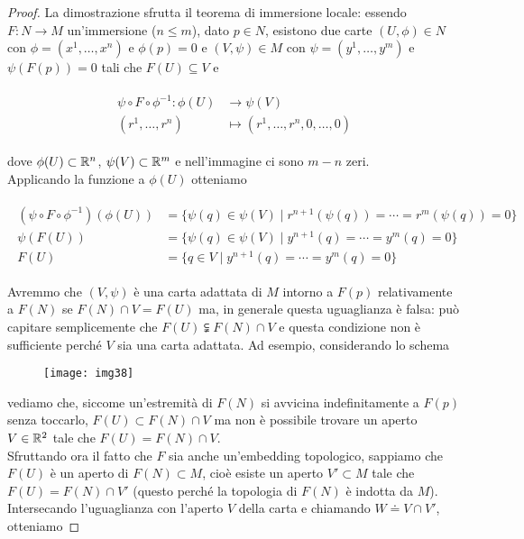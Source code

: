 \begin{proof}
	La dimostrazione sfrutta il teorema di immersione locale: essendo $ F : N \to M $ un'immersione ($ n \leqslant m $), dato $ p \in N $, esistono due carte $ (U,\phi) \in N $ con $ \phi = (x^{1},\dots,x^{n}) $ e $ \phi(p)=0 $ e $ (V,\psi) \in M $ con $ \psi = (y^{1},\dots,y^{m}) $ e $ \psi(F(p))=0 $ tali che $ F(U) \subseteq V $ e
	
	\begin{align}
		\begin{split}
			\psi \circ F \circ \phi^{-1} : \phi(U) &\to \psi(V)\\
			(r^{1},\dots,r^{n}) &\mapsto (r^{1},\dots,r^{n},0,\dots,0)
		\end{split}
	\end{align}

	dove $ \phi(U) \subset \mathbb{R}^{n} $, $ \psi(V) \subset \mathbb{R}^{m} $ e nell'immagine ci sono $ m-n $ zeri.\\
	Applicando la funzione a $ \phi(U) $ otteniamo
	
	\begin{align}
		\begin{split}
			(\psi \circ F \circ \phi^{-1})(\phi(U)) &= \{ \psi(q) \in \psi(V) \mid r^{n+1}(\psi(q)) = \cdots = r^{m}(\psi(q)) = 0 \}\\
			\psi(F(U)) &= \{ \psi(q) \in \psi(V) \mid y^{n+1}(q) = \cdots = y^{m}(q) = 0 \}\\
			F(U) &= \{ q \in V \mid y^{n+1}(q) = \cdots = y^{m}(q) = 0 \}
		\end{split}
	\end{align}

	Avremmo che $ (V,\psi) $ è una carta adattata di $ M $ intorno a $ F(p) $ relativamente a $ F(N) $ se $ F(N) \cap V = F(U) $ ma, in generale questa uguaglianza è falsa: può capitare semplicemente che $ F(U) \subsetneqq F(N) \cap V $ e questa condizione non è sufficiente perché $ V $ sia una carta adattata. Ad esempio, considerando lo schema
	
	\begin{figure}[H]
		\centering
		\texttt{[image: img38]}
	\end{figure}
	
	vediamo che, siccome un'estremità di $ F(N) $ si avvicina indefinitamente a $ F(p) $ senza toccarlo, $ F(U) \subset F(N) \cap V $ ma non è possibile trovare un aperto $ V \in \mathbb{R}^{2} $ tale che $ F(U) = F(N) \cap V $.\\
	Sfruttando ora il fatto che $ F $ sia anche un'embedding topologico, sappiamo che $ F(U) $ è un aperto di $ F(N) \subset M $, cioè esiste un aperto $ V' \subset M $ tale che $ F(U) = F(N) \cap V' $ (questo perché la topologia di $ F(N) $ è indotta da $ M $). Intersecando l'uguaglianza con l'aperto $ V $ della carta e chiamando $ W \doteq V \cap V' $, otteniamo
	

\end{proof}
